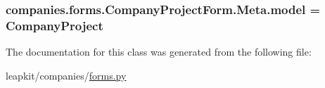 \hypertarget{classcompanies_1_1forms_1_1_company_project_form_1_1_meta_a44c0687986a0e965a21226b737bacebb}{
\subsubsection[{model}]{\setlength{\rightskip}{0pt plus 5cm}companies.\-forms.\-Company\-Project\-Form.\-Meta.\-model = Company\-Project\hspace{0.3cm}{\ttfamily [static]}}}\label{classcompanies_1_1forms_1_1_company_project_form_1_1_meta_a44c0687986a0e965a21226b737bacebb}


The documentation for this class was generated from the following file\-:\begin{DoxyCompactItemize}
\item 
leapkit/companies/\hyperlink{companies_2forms_8py}{forms.\-py}\end{DoxyCompactItemize}
